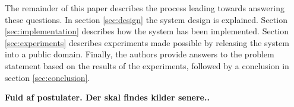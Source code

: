 The remainder of this paper describes the process leading towards answering these questions. In section \ref{sec:design} the system design is explained. Section \ref{sec:implementation} describes how the system has been implemented. Section \ref{sec:experiments} describes experiments made possible by releasing the system into a public domain. Finally, the authors provide answers to the problem statement based on the results of the experiments, followed by a conclusion in section \ref{sec:conclusion}.

\textbf{Fuld af postulater. Der skal findes kilder senere..}

